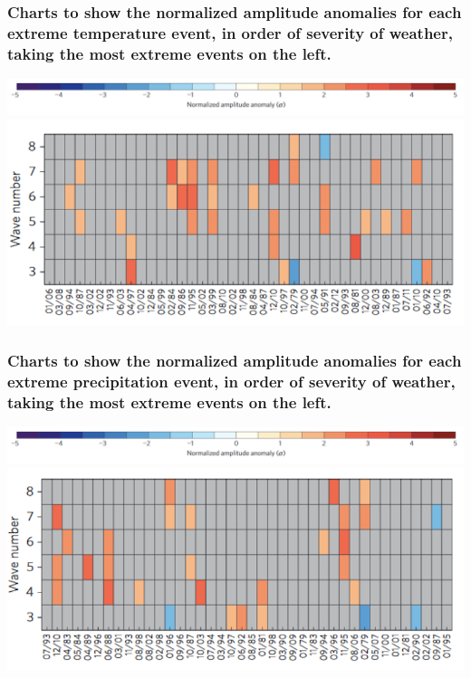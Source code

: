 \documentclass[12pt]{beamer}
\begin{document}
\begin{frame}
\frametitle{Charts to show the normalized amplitude anomalies for each extreme temperature event, in order of severity of weather, taking the most extreme events on the left.}
\centering
\includegraphics[scale=0.4]{Cathie4}
\includegraphics[scale=0.7]{Cathie5}
\end{frame}
\begin{frame}
\frametitle{Charts to show the normalized amplitude anomalies for each extreme precipitation event, in order of severity of weather, taking the most extreme events on the left.}
\centering
\includegraphics[scale=0.4]{Cathie4}
\includegraphics[scale=0.7]{Cathie6}
\end{frame}
\end{document}
